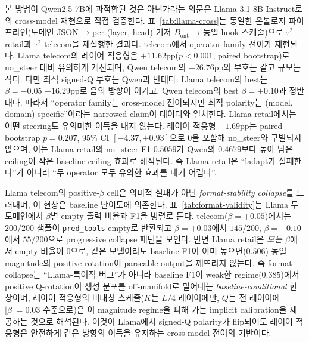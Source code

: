 본 방법이 Qwen2.5-7B에 과적합된 것은 아닌가라는 의문은 Llama-3.1-8B-Instruct로의 cross-model 재현으로 직접 검증한다. 표~\ref{tab:llama-cross}는 동일한 온톨로지 파이프라인(도메인 JSON → per-(layer, head) 기저 $B_{\mathrm{ont}}$ → 동일 hook 스케줄)으로 $\tau^2$-retail과 $\tau^2$-telecom을 재실행한 결과다. telecom에서 operator family 전이가 재현된다. Llama telecom의 레이어 적응형은 $+11.62$pp($p<0.001$, paired bootstrap)로 no\_steer 대비 유의하게 개선되며, Qwen telecom의 $+26.76$pp와 부호는 같고 규모는 작다. 다만 최적 signed-Q 부호는 Qwen과 반대다: Llama telecom의 best는 $\beta{=}{-}0.05$ $+16.29$pp로 음의 방향이 이기고, Qwen telecom의 best $\beta{=}{+}0.10$과 정반대다. 따라서 ``operator family는 cross-model 전이되지만 최적 polarity는 (model, domain)-specific''이라는 narrowed claim이 데이터와 일치한다. Llama retail에서는 어떤 steering도 유의미한 이득을 내지 않는다. 레이어 적응형 $-1.69$pp는 paired bootstrap $p=0.207$, 95\% CI $[-4.37, +0.93]$으로 0을 포함해 no\_steer와 구별되지 않으며, 이는 Llama retail의 no\_steer F1 $0.5059$가 Qwen의 $0.4679$보다 높아 남은 ceiling이 작은 baseline-ceiling 효과로 해석된다. 즉 Llama retail은 ``ladapt가 실패한다''가 아니라 ``두 operator 모두 유의한 효과를 내기 어렵다''.

Llama telecom의 positive-$\beta$ cell은 의미적 실패가 아닌 \emph{format-stability collapse}를 드러내며, 이 현상은 baseline 난이도에 의존한다. 표~\ref{tab:format-validity}는 Llama 두 도메인에서 $\beta$별 empty 출력 비율과 F1을 병렬로 둔다. telecom($\beta{=}{+}0.05$)에서는 $200/200$ 샘플이 \texttt{pred\_tools} empty로 반환되고 $\beta{=}{+}0.03$에서 $145/200$, $\beta{=}{+}0.10$에서 $55/200$으로 progressive collapse 패턴을 보인다. 반면 Llama retail은 \emph{모든 $\beta$}에서 empty 비율이 0으로, 같은 모델이라도 baseline F1이 이미 높으면($0.506$) 동일 magnitude의 positive rotation이 parseable output을 깨뜨리지 않는다. 즉 format collapse는 ``Llama-특이적 버그''가 아니라 baseline F1이 weak한 regime($0.385$)에서 positive Q-rotation이 생성 분포를 off-manifold로 밀어내는 \emph{baseline-conditional} 현상이며, 레이어 적응형의 비대칭 스케줄($K$는 $L/4$ 레이어에만, $Q$는 전 레이어에 $|\beta|=0.03$ 수준으로)은 이 magnitude regime을 피해 가는 implicit calibration을 제공하는 것으로 해석된다. 이것이 Llama에서 signed-Q polarity가 flip되어도 레이어 적응형은 안전하게 같은 방향의 이득을 유지하는 cross-model 전이의 기반이다.

